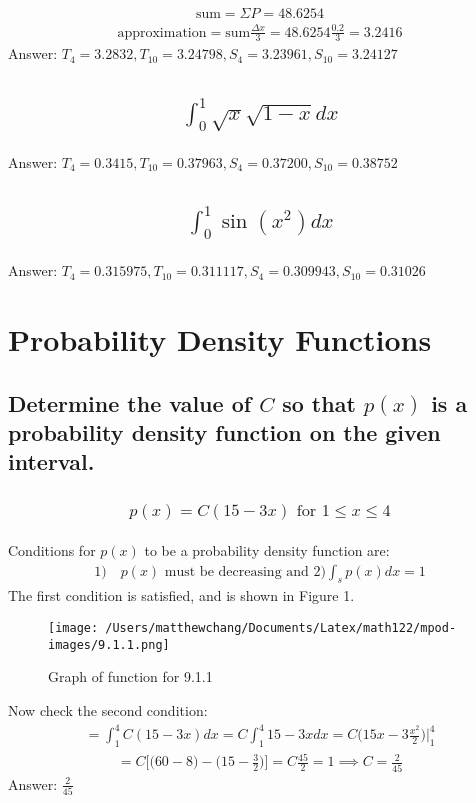 \documentclass{article}
\begin{document}
\begin{align*}
	\text{sum} = \Sigma{P} = 48.6254
\end{align*}
\begin{align*}
	\text{approximation} = \text{sum} \frac{\Delta x}{3} = 48.6254 \frac{0.2}{3} = 3.2416
\end{align*}
Answer: $T_4 = 3.2832, T_{10} = 3.24798, S_4 = 3.23961, S_{10} = 3.24127$

\subsection{
	\begin{align*}
		\int_0^1{\sqrt{x} \sqrt{1 - x} dx}
	\end{align*}
}
Answer: $T_4 = 0.3415, T_{10} = 0.37963, S_4 = 0.37200, S_{10} = 0.38752$
\subsection{
	\begin{align*}
		\int_0^1{\sin{(x^2)} dx}
	\end{align*}
}
Answer: $T_4 = 0.315975, T_{10} = 0.311117, S_4 = 0.309943, S_{10} = 0.31026$

\section{Probability Density Functions}
\subsection{Determine the value of $C$ so that $p(x)$ is a probability density function on the given interval.}
\subsubsection{
	\begin{align*}
		p(x) = C(15 - 3x) \text{ for } 1 \leq x \leq 4
	\end{align*}
}
Conditions for $p(x)$ to be a probability density function are:
\begin{align*}
	1) \quad p(x) \text{ must be decreasing and }
	2) \int_s{p(x)dx} = 1
\end{align*}
The first condition is satisfied, and is shown in Figure 1. 
\begin{figure}
	\centering
	\texttt{[image: /Users/matthewchang/Documents/Latex/math122/mpod-images/9.1.1.png]}
	\caption{Graph of function for 9.1.1}
\end{figure}
Now check the second condition:
\begin{align*}
	= \int_1^4{C(15 - 3x)dx} = C \int_1^4{15 - 3x dx} = C \bigg( 15x - 3\frac{x^2}{2} \bigg) \bigg|_1^4
\end{align*}
\begin{align*}
	= C \bigg[ \bigg( 60 - 8 \bigg) - \bigg( 15 - \frac{3}{2} \bigg) \bigg] = C \frac{45}{2} = 1 \implies C = \frac{2}{45}
\end{align*}
Answer: $\frac{2}{45}$
\end{document}
